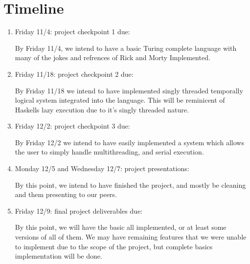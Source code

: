 \documentclass[numbers]{sigplanconf}
\begin{document}
\section{Timeline}
\begin{enumerate}
\item    Friday 11/4: project checkpoint 1 due:

  By Friday 11/4, we intend to have a basic Turing complete language
  with many of the jokes and refrences of Rick and Morty Implemented.

\item  Friday 11/18: project checkpoint 2 due:

By Friday 11/18 we intend to have implemented singly threaded
temporally logical system integrated into the language. This will be 
reminicent of Haskells lazy execution due to it's singly threaded nature.

\item  Friday 12/2: project checkpoint 3 due:
  
  By Friday 12/2 we intend to have easily implemented a system which
  allows the user to simply handle multithreading, and serial execution.

\item  Monday 12/5 and Wednesday 12/7: project presentations:

By this point, we intend to have finished the project, and mostly be
cleaning and them presenting to our peers.

\item Friday 12/9: final project deliverables due:

By this point, we will have the basic all implemented, or at least
some versions of all of them. We may have remaining features that we
were unable to implement due to the scope of the project, but complete
basics implementation will be done.
\end{enumerate}





{}
\end{document}
